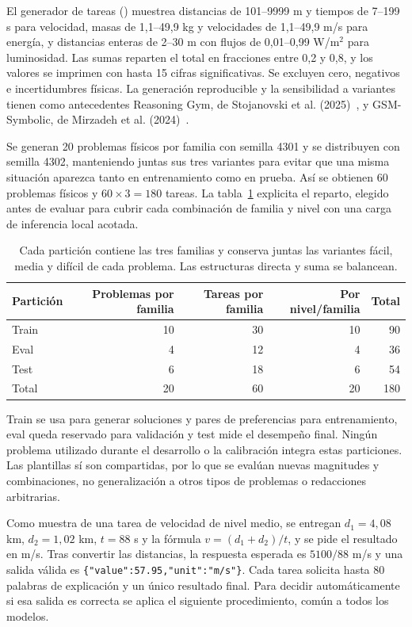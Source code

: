 El generador de tareas ()
muestrea distancias de 101--9999 m y tiempos de 7--199 s para velocidad, masas
de 1,1--49,9 kg y velocidades de 1,1--49,9 m/s para energía, y distancias
enteras de 2--30 m con flujos de 0,01--0,99 W/m$^2$ para luminosidad. Las
sumas reparten el total en fracciones entre 0,2 y 0,8, y los valores se imprimen
con hasta 15 cifras significativas. Se excluyen cero, negativos e incertidumbres
físicas. La generación reproducible y la sensibilidad a variantes tienen como
antecedentes Reasoning Gym, de Stojanovski et al. (2025)~\cite{reasoninggym}, y
GSM-Symbolic, de Mirzadeh et al. (2024)~\cite{gsmsymbolic}.

Se generan 20 problemas físicos por familia con semilla 4301 y se distribuyen
con semilla 4302, manteniendo juntas sus tres variantes para evitar que una
misma situación aparezca tanto en entrenamiento como en prueba. Así se obtienen
60 problemas físicos y $60\times3=180$ tareas. La tabla~\ref{tab:dataset}
explicita el reparto, elegido antes de evaluar para cubrir cada combinación de
familia y nivel con una carga de inferencia local acotada.

\begin{table}[ht]
\centering
\begin{tabular}{lrrrr}
Partición & Problemas por familia & Tareas por familia & Por nivel/familia & Total \\
\midrule
Train & 10 & 30 & 10 & 90 \\
Eval & 4 & 12 & 4 & 36 \\
Test & 6 & 18 & 6 & 54 \\
\midrule
Total & 20 & 60 & 20 & 180 \\
\end{tabular}
\caption{Cada partición contiene las tres familias y conserva juntas las variantes
fácil, media y difícil de cada problema. Las estructuras directa y suma se balancean.}
\label{tab:dataset}
\end{table}

Train se usa para generar soluciones y pares de preferencias para entrenamiento,
eval queda reservado para validación y test mide el desempeño final. Ningún problema utilizado durante
el desarrollo o la calibración integra estas particiones. Las plantillas sí
son compartidas, por lo que se evalúan nuevas magnitudes y combinaciones,
no generalización a otros tipos de problemas o redacciones arbitrarias.

Como muestra de una tarea de velocidad de nivel medio, se entregan $d_1=4{,}08$ km,
$d_2=1{,}02$ km, $t=88$ s y la fórmula $v=(d_1+d_2)/t$, y se pide el resultado
en m/s. Tras convertir las distancias, la respuesta esperada es $5100/88$
m/s y una salida válida es \verb|{"value":57.95,"unit":"m/s"}|.
Cada tarea solicita hasta 80 palabras de explicación y un único resultado final.
Para decidir automáticamente si esa salida es correcta se aplica el siguiente
procedimiento, común a todos los modelos.

